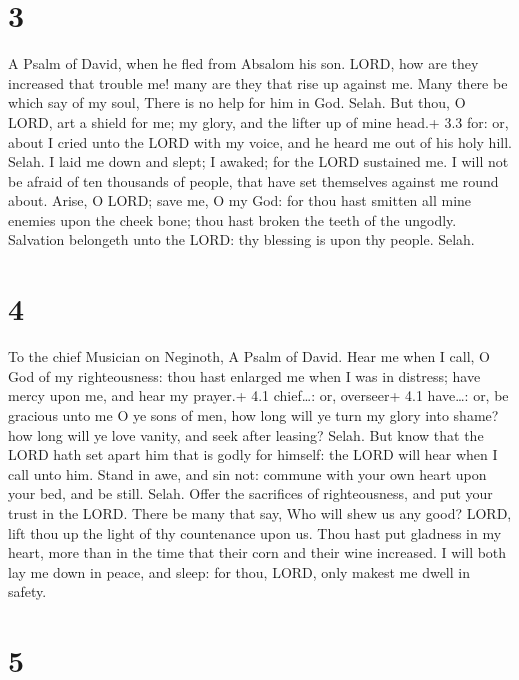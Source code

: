 \hypertarget{section-2}{%
\section{3}\label{section-2}}

A Psalm of David, when he fled from Absalom his son.  LORD,
how are they increased that trouble me! many are they that rise up
against me.  Many there be which say of my soul, There is no
help for him in God. Selah.  But thou, O LORD, art a shield
for me; my glory, and the lifter up of mine head.+ 3.3 for: or, about
 I cried unto the LORD with my voice, and he heard me out of
his holy hill. Selah.  I laid me down and slept; I awaked;
for the LORD sustained me.  I will not be afraid of ten
thousands of people, that have set themselves against me round about.
 Arise, O LORD; save me, O my God: for thou hast smitten all
mine enemies upon the cheek bone; thou hast broken the teeth of the
ungodly.  Salvation belongeth unto the LORD: thy blessing is
upon thy people. Selah.

\hypertarget{section-3}{%
\section{4}\label{section-3}}

To the chief Musician on Neginoth, A Psalm of David.  Hear
me when I call, O God of my righteousness: thou hast enlarged me when I
was in distress; have mercy upon me, and hear my prayer.+ 4.1
chief\ldots: or, overseer+ 4.1 have\ldots: or, be gracious unto me
 O ye sons of men, how long will ye turn my glory into
shame? how long will ye love vanity, and seek after leasing? Selah.
 But know that the LORD hath set apart him that is godly for
himself: the LORD will hear when I call unto him.  Stand in
awe, and sin not: commune with your own heart upon your bed, and be
still. Selah.  Offer the sacrifices of righteousness, and
put your trust in the LORD.  There be many that say, Who
will shew us any good? LORD, lift thou up the light of thy countenance
upon us.  Thou hast put gladness in my heart, more than in
the time that their corn and their wine increased.  I will
both lay me down in peace, and sleep: for thou, LORD, only makest me
dwell in safety.

\hypertarget{section-4}{%
\section{5}\label{section-4}}

